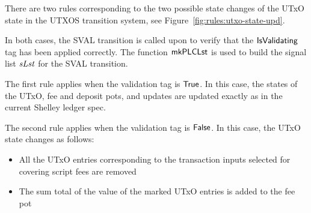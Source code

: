 There are two rules corresponding to the two possible state changes of the
UTxO state in the UTXOS transition system, see Figure~\ref{fig:rules:utxo-state-upd}.

In both cases, the SVAL transition is called upon to verify that the $\mathsf{IsValidating}$
tag has been applied correctly. The function $\mathsf{mkPLCLst}$ is used to build
the signal list $\mathit{sLst}$ for the SVAL transition.

The first rule
applies when the validation tag is $\mathsf{True}$.
In this case, the states of the UTxO, fee
  and deposit pots, and updates are updated exactly as in the current Shelley
  ledger spec.

  The second rule
  applies when the validation tag is $\mathsf{False}$.
  In this case, the UTxO state changes as follows:

  \begin{itemize}
    \item All the
    UTxO entries corresponding to the transaction inputs selected for covering
    script fees are removed

    \item The sum total of the value of the marked UTxO entries
    is added to the fee pot
  \end{itemize}


